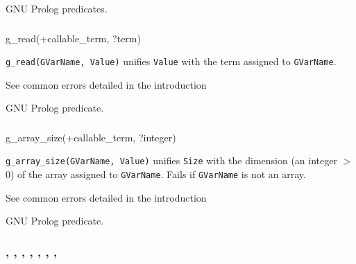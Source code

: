 \Portability

GNU Prolog predicates.

\subsubsection{}

\begin{TemplatesOneCol}
g\_read(+callable\_term, ?term)

\end{TemplatesOneCol}

\Description

\texttt{g\_read(GVarName, Value)} unifies \texttt{Value} with the term
assigned to \texttt{GVarName}.

\Errors

See common errors detailed in the introduction 

\Portability

GNU Prolog predicate.

\subsubsection{}

\begin{TemplatesOneCol}
g\_array\_size(+callable\_term, ?integer)

\end{TemplatesOneCol}

\Description

\texttt{g\_array\_size(GVarName, Value)} unifies \texttt{Size} with the
dimension (an integer $>$ 0) of the array assigned to \texttt{GVarName}.
Fails if \texttt{GVarName} is not an array.

\Errors

See common errors detailed in the introduction 

\begin{PlErrorsNoTitle}


\end{PlErrorsNoTitle}

\Portability

GNU Prolog predicate.

\subsubsection{,
               ,
               ,
               ,
               ,
               ,
               ,
               }

